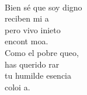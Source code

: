 \documentclass[12pt]{article}
\begin{document}
\begin{multicols*}{2}
\begin{cancion}
\begin{chorus}
	\end{chorus}%
	\jump\\
	Bien sé que soy digno \\
	reciben mi a\\
	pero vivo inieto\\
	 encont  moa.\\
\jump
	Como el pobre queo, \\
	 has querido rar\\
	 tu humilde esencia \\
	 coloi a. \\
\end{cancion}%


\end{multicols*}
\end{document}
